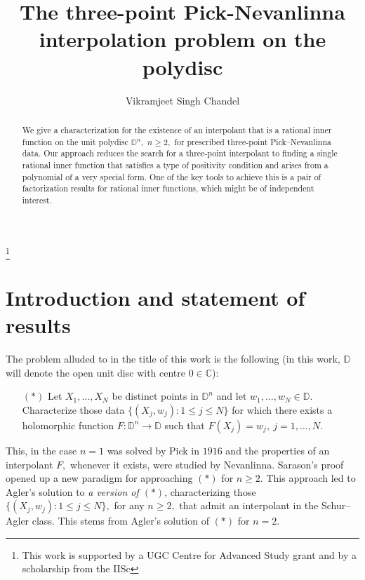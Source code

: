 \documentclass[11pt, reqno]{amsart}
\numberwithin{equation}{section}
\theoremstyle{definition}
\theoremstyle{remark}
\theoremstyle{plain}
\begin{document}
\title[The three-point Pick interpolation problem]{The three-point Pick-Nevanlinna interpolation problem on the polydisc}

\author{Vikramjeet Singh Chandel}
\address{Department of Mathematics, Indian Institute of Science, Bangalore 560012, India}

\thanks{This work is supported by a UGC Centre for
Advanced Study grant and by a scholarship from the IISc}


\begin{abstract}
We give a characterization for the existence of an interpolant that is a rational inner function on 
the unit polydisc ${\mathbb{D}}^n,$ $n\geq 2,$ for prescribed three-point Pick--Nevanlinna data. Our approach reduces
the search for a three-point interpolant to finding a single rational inner function that satisfies a type of
positivity condition and arises from a polynomial of a very special form.
One of the key tools to achieve this is a pair of factorization results for rational inner functions,
which might be of independent interest. 
\end{abstract}
\maketitle

\section{Introduction and statement of results}\label{S:intro}
The problem alluded to in the title of this work is the following
(in this work, ${\mathbb{D}}$ will denote the open unit disc with centre $0\in{\mathbb{C}}$):
\begin{itemize}
\item[$(*)$] Let $X_1,\ldots,X_{N}$ be distinct points in ${\mathbb{D}}^n$ and let $w_1,\ldots,w_{N}\in{\mathbb{D}}.$
Characterize those data $\{(X_j,w_j):1\leq j\leq N\}$ for which there exists a holomorphic function
$F:{\mathbb{D}}^n\longrightarrow{\mathbb{D}}$ such that $F(X_j)=w_j, \ j=1,\ldots,N.$
\end{itemize}
\noindent This, in the case $n=1$ was solved by Pick in $1916$ and the properties 
of an interpolant $F,$ whenever it exists, were studied by Nevanlinna. Sarason's proof 
\cite{sarason:ftp67} opened up a new paradigm 
for approaching $(*)$ for $n\geq 2.$ This approach led to Agler's solution to {\em a version of $(*)$},
characterizing those $\{(X_j,w_j):1\leq j\leq N\},$ for any $n\geq 2,$ that admit
an interpolant in the Schur--Agler class. This stems from Agler's solution \cite{ag:ftp88} of $(*)$ for $n=2.$
\smallskip
\end{document}
